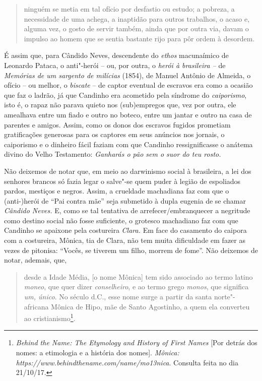\begin{quote}
ninguém se metia em tal ofício por desfastio ou estudo; a pobreza, a
necessidade de uma achega, a inaptidão para outros trabalhos, o acaso e,
alguma vez, o gosto de servir também, ainda que por outra via, davam o
impulso ao homem que se sentia bastante rijo para pôr ordem à desordem.
\end{quote}

É assim que, para Cândido Neves, descendente do \emph{ethos} macunaímico
de Leonardo Pataca, o anti"-herói -- ou, por outra, o \emph{herói à
brasileira --} de \emph{Memórias de um sargento de milícias} (1854), de
Manuel Antônio de Almeida, o ofício -- ou melhor, o \emph{biscate} -- de
captor eventual de escravos era como a ocasião que faz o ladrão, já que
Candinho era acometido pela síndrome do \emph{caiporismo}, isto é, o
rapaz não parava quieto nos (sub)empregos que, vez por outra, ele
amealhava entre um fiado e outro no boteco, entre um jantar e outro na
casa de parentes e amigos. Assim, como os donos dos escravos fugidos
prometiam gratificações generosas para os captores em seus anúncios nos
jornais, o caiporismo e o dinheiro fácil faziam com que Candinho
ressignificasse o anátema divino do Velho Testamento: \emph{Ganharás o
pão sem o suor do teu rosto. }

Não deixemos de notar que, em meio ao darwinismo social à brasileira, a
lei dos senhores brancos só fazia legar o salve"-se quem puder à legião
de espoliados pardos, mestiços e negros. Assim, a crueldade machadiana
faz com que o \mbox{(anti-)herói} de ``Pai contra mãe'' seja submetido à dupla
eugenia de se chamar \emph{Cândido Neves.} E, como se tal tentativa de
arrefecer/embranquecer a negritude como destino social não fosse
suficiente, o grotesco machadiano faz com que Candinho se apaixone pela
costureira \emph{Clara.} Em face do casamento do caipora com a
costureira, Mônica, tia de Clara, não tem muita dificuldade em fazer as
vezes de pitonisa: ``Vocês, se tiverem um filho, morrem de fome''. Não
deixemos de notar, ademais, que,

\begin{quote}
desde a Idade Média, [o nome Mônica] tem sido associado ao termo
latino \emph{moneo}, que quer dizer \emph{conselheiro}, e ao termo grego
\emph{monos}, que significa \emph{um, único}. No século  d.C., esse
nome surge a partir da santa norte"-africana Mônica de Hipo, mãe de Santo
Agostinho, a quem ela converteu ao cristianismo\footnote{\emph{Behind
  the Name: The Etymology and History of First Names} [Por detrás dos
  nomes: a etimologia e a história dos nomes]. \emph{Mônica: https://www.behindthename.com/name/mo13nica}.
  Consulta feita no dia 21/10/17.}.
\end{quote}

